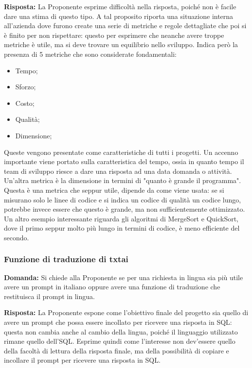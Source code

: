 \par \textbf{Risposta:} La Proponente esprime difficoltà nella risposta, poiché non è facile dare una stima di questo tipo.
A tal proposito riporta una situazione interna all'azienda dove furono create una serie di metriche e regole dettagliate che poi si è finito per non rispettare: questo per esprimere che neanche avere troppe metriche è utile, ma si deve trovare un equilibrio nello sviluppo.
Indica però la presenza di 5 metriche che sono considerate fondamentali:
\begin{itemize}
	\item Tempo;
	\item Sforzo;
	\item Costo;
	\item Qualità;
	\item Dimensione;
\end{itemize}
Queste vengono presentate come caratteristiche di tutti i progetti.
Un accenno importante viene portato sulla caratteristica del tempo, ossia in quanto tempo il team di sviluppo riesce a dare una risposta ad una data domanda o attività.
Un'altra metrica è la dimensione in termini di "quanto è grande il programma". 
Questa è una metrica che seppur utile, dipende da come viene usata: se si misurano solo le linee di codice e si indica un codice di qualità un codice lungo, potrebbe invece essere che questo è grande, ma non sufficientemente ottimizzato. 
Un altro esempio interessante riguarda gli algoritmi di MergeSort e QuickSort, dove il primo seppur molto più lungo in termini di codice, è meno efficiente del secondo.

\subsubsection{Funzione di traduzione di txtai}
\par \textbf{Domanda:} Si chiede alla Proponente se per una richiesta in lingua sia più utile avere un prompt in italiano oppure avere una funzione di traduzione che restituisca il prompt in lingua.

\par \textbf{Risposta:} La Proponente espone come l'obiettivo finale del progetto sia quello di avere un prompt che possa essere incollato per ricevere una risposta in SQL: questa non cambia anche al cambio della lingua, poiché il linguaggio utilizzato rimane quello dell'SQL.
Esprime quindi come l'interesse non dev'essere quello della facoltà di lettura della risposta finale, ma della possibilità di copiare e incollare il prompt per ricevere una risposta in SQL.
